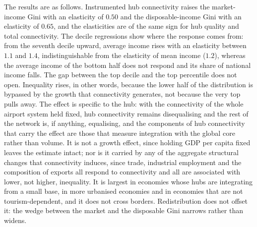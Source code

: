The results are as follows. Instrumented hub connectivity raises the market-income Gini with an elasticity of $0.50$ and the disposable-income Gini with an elasticity of $0.65$, and the elasticities are of the same sign for hub quality and total connectivity. The decile regressions show where the response comes from: from the seventh decile upward, average income rises with an elasticity between $1.1$ and $1.4$, indistinguishable from the elasticity of mean income ($1.2$), whereas the average income of the bottom half does not respond and its share of national income falls. The gap between the top decile and the top percentile does not open. Inequality rises, in other words, because the lower half of the distribution is bypassed by the growth that connectivity generates, not because the very top pulls away. The effect is specific to the hub: with the connectivity of the whole airport system held fixed, hub connectivity remains disequalising and the rest of the network is, if anything, equalising, and the components of hub connectivity that carry the effect are those that measure integration with the global core rather than volume. It is not a growth effect, since holding GDP per capita fixed leaves the estimate intact; nor is it carried by any of the aggregate structural changes that connectivity induces, since trade, industrial employment and the composition of exports all respond to connectivity and all are associated with lower, not higher, inequality. It is largest in economies whose hubs are integrating from a small base, in more urbanised economies and in economies that are not tourism-dependent, and it does not cross borders. Redistribution does not offset it: the wedge between the market and the disposable Gini narrows rather than widens.

